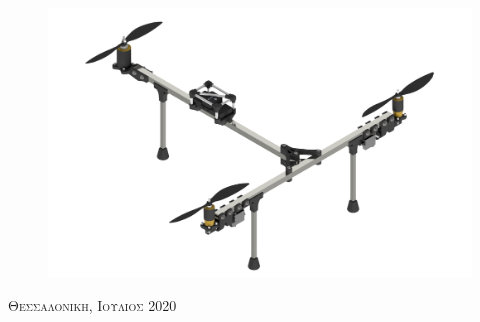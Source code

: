 \begin{titlepage}
\begin{figure}[H]
    \centering
    \includegraphics[width=1\textwidth]{Title_Page/Assembly_1.png}
\end{figure}

{\large \textsc{Θεσσαλονικη, Ιουλιος 2020}}\\%

\end{titlepage}
\cleardoublepage